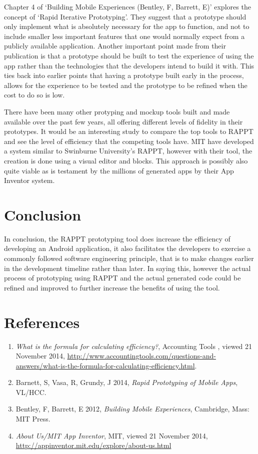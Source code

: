 \documentclass[11pt,english,numbers=endperiod,parskip=half,abstract=on]{scrreprt}
\begin{document}
\begin{itemize}
    Chapter 4 of `Building Mobile Experiences (Bentley, F, Barrett, E)' explores
    the concept of `Rapid Iterative Prototyping'. They suggest that a prototype
    should only implement what is absolutely necessary for the app to function,
    and not to include smaller less important features that one would normally
    expect from a publicly available application. Another important point made
    from their publication is that a prototype should be built to test the
    experience of using the app rather than the technologies that the developers
    intend to build it with. This ties back into earlier points that having a
    prototype built early in the process, allows for the experience to be tested
    and the prototype to be refined when the cost to do so is low.

    There have been many other protyping and mockup tools built and made available over the
    past few years, all offering different levels of fidelity in their prototypes.
    It would be an interesting study to compare the top tools to RAPPT and see
    the level of efficiency that the competing tools have. MIT have developed a
    system similar to Swinburne University's RAPPT, however
    with their tool, the creation is done using a visual editor and blocks. This
    approach is possibly also quite viable as is testament by the millions of
    generated apps by their App Inventor system.
  \end{itemize}
\newpage
\section{Conclusion}
  In conclusion, the RAPPT prototyping tool does increase the efficiency of
  developing an Android application, it also facilitates the developers to exercise
  a commonly followed software engineering principle, that is to make changes
  earlier in the development timeline rather than later. In saying this, however
   the actual process of prototyping using RAPPT
  and the actual generated code could be refined and improved to further
  increase the benefits of using the tool.

\section{References}
  \begin{enumerate}
    \item{
      \textit{What is the formula for calculating efficiency?}, Accounting Tools
      , viewed 21 November 2014,
      \url{http://www.accountingtools.com/questions-and-answers/what-is-the-formula-for-calculating-efficiency.html}.
    }
    \item{
      Barnett, S, Vasa, R, Grundy, J 2014,
      \textit{Rapid Prototyping of Mobile Apps}, VL/HCC.
    }
    \item{
      Bentley, F, Barrett, E 2012, \textit{Building Mobile Experiences},
      Cambridge, Mass: MIT Press.
    }
    \item{
      \textit{About Us/MIT App Inventor}, MIT, viewed 21 November 2014,
      \url{http://appinventor.mit.edu/explore/about-us.html}
    }
  \end{enumerate}
\end{document}
